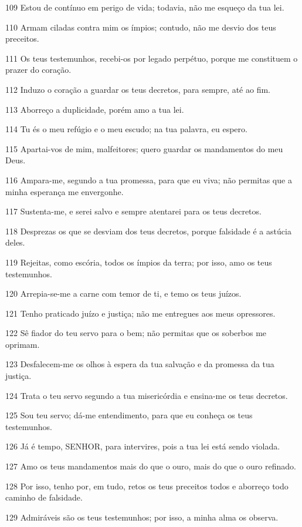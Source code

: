 \par 109 Estou de contínuo em perigo de vida; todavia, não me esqueço da tua lei.
\par 110 Armam ciladas contra mim os ímpios; contudo, não me desvio dos teus preceitos.
\par 111 Os teus testemunhos, recebi-os por legado perpétuo, porque me constituem o prazer do coração.
\par 112 Induzo o coração a guardar os teus decretos, para sempre, até ao fim.
\par 113 Aborreço a duplicidade, porém amo a tua lei.
\par 114 Tu és o meu refúgio e o meu escudo; na tua palavra, eu espero.
\par 115 Apartai-vos de mim, malfeitores; quero guardar os mandamentos do meu Deus.
\par 116 Ampara-me, segundo a tua promessa, para que eu viva; não permitas que a minha esperança me envergonhe.
\par 117 Sustenta-me, e serei salvo e sempre atentarei para os teus decretos.
\par 118 Desprezas os que se desviam dos teus decretos, porque falsidade é a astúcia deles.
\par 119 Rejeitas, como escória, todos os ímpios da terra; por isso, amo os teus testemunhos.
\par 120 Arrepia-se-me a carne com temor de ti, e temo os teus juízos.
\par 121 Tenho praticado juízo e justiça; não me entregues aos meus opressores.
\par 122 Sê fiador do teu servo para o bem; não permitas que os soberbos me oprimam.
\par 123 Desfalecem-me os olhos à espera da tua salvação e da promessa da tua justiça.
\par 124 Trata o teu servo segundo a tua misericórdia e ensina-me os teus decretos.
\par 125 Sou teu servo; dá-me entendimento, para que eu conheça os teus testemunhos.
\par 126 Já é tempo, SENHOR, para intervires, pois a tua lei está sendo violada.
\par 127 Amo os teus mandamentos mais do que o ouro, mais do que o ouro refinado.
\par 128 Por isso, tenho por, em tudo, retos os teus preceitos todos e aborreço todo caminho de falsidade.
\par 129 Admiráveis são os teus testemunhos; por isso, a minha alma os observa.
